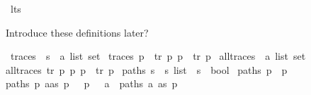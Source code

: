%
\begin{isabellebody}%
%
%
\isadelimtheory
%
\endisadelimtheory
%
\isatagtheory
%
\endisatagtheory
{\isafoldtheory}%
%
\isadelimtheory
\isanewline
%
\endisadelimtheory
{}\isamarkupfalse%
\ lts\isanewline
{}%
\begin{isamarkuptext}%
Introduce these definitions later?%
\end{isamarkuptext}\isamarkuptrue%
\isamarkupfalse%
\ traces\ {\isacharcolon}{\kern0pt}{\isacharcolon}{\kern0pt}\ {\isacartoucheopen}{\isacharprime}{\kern0pt}s\ {\isasymRightarrow}\ {\isacharprime}{\kern0pt}a\ list\ set{\isacartoucheclose}\ \isanewline
{\isacartoucheopen}traces\ p\ {\isasymequiv}\ {\isacharbraceleft}{\kern0pt}tr{\isachardot}{\kern0pt}\ {\isasymexists}p{\isacharprime}{\kern0pt}{\isachardot}{\kern0pt}\ p\ {\isasymmapsto}{\isachardollar}{\kern0pt}\ tr\ p{\isacharprime}{\kern0pt}{\isacharbraceright}{\kern0pt}{\isacartoucheclose}\isanewline
\isanewline
{}\isamarkupfalse%
\ all{\isacharunderscore}{\kern0pt}traces\ {\isacharcolon}{\kern0pt}{\isacharcolon}{\kern0pt}\ {\isachardoublequoteopen}{\isacharprime}{\kern0pt}a\ list\ set{\isachardoublequoteclose}\ \isanewline
{\isachardoublequoteopen}all{\isacharunderscore}{\kern0pt}traces\ {\isasymequiv}{\isacharbraceleft}{\kern0pt}tr{\isachardot}{\kern0pt}\ {\isasymexists}p\ p{\isacharprime}{\kern0pt}{\isachardot}{\kern0pt}\ p\ {\isasymmapsto}{\isachardollar}{\kern0pt}\ tr\ p{\isacharprime}{\kern0pt}{\isacharbraceright}{\kern0pt}{\isachardoublequoteclose}\isanewline
\isanewline
{}\isamarkupfalse%
\ paths{\isacharcolon}{\kern0pt}{\isacharcolon}{\kern0pt}\ {\isacartoucheopen}{\isacharprime}{\kern0pt}s\ {\isasymRightarrow}\ {\isacharprime}{\kern0pt}s\ list\ {\isasymRightarrow}\ {\isacharprime}{\kern0pt}s\ {\isasymRightarrow}\ bool{\isacartoucheclose}\ \isanewline
{\isacartoucheopen}paths\ p\ {\isacharbrackleft}{\kern0pt}{\isacharbrackright}{\kern0pt}\ p{\isacartoucheclose}\ {\isacharbar}{\kern0pt}\isanewline
{\isacartoucheopen}paths\ p\ {\isacharparenleft}{\kern0pt}a{\isacharhash}{\kern0pt}as{\isacharparenright}{\kern0pt}\ p{\isacharprime}{\kern0pt}{\isacharprime}{\kern0pt}{\isacartoucheclose}\ \ {\isachardoublequoteopen}{\isasymexists}{\isasymalpha}{\isachardot}{\kern0pt}\ p\ {\isasymmapsto}\ {\isasymalpha}\ a\ {\isasymand}\ {\isacharparenleft}{\kern0pt}paths\ a\ as\ p{\isacharprime}{\kern0pt}{\isacharprime}{\kern0pt}{\isacharparenright}{\kern0pt}{\isachardoublequoteclose}\isanewline

\end{isabellebody}
